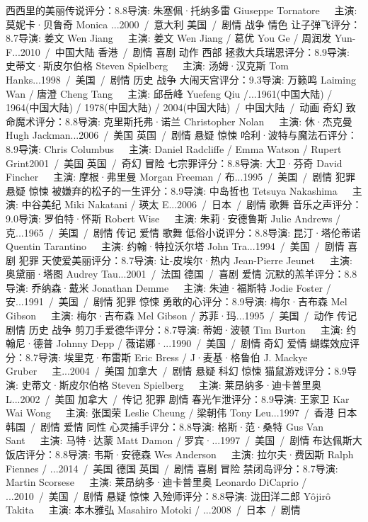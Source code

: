 西西里的美丽传说评分：8.8导演: 朱塞佩·托纳多雷 Giuseppe Tornatore   主演: 莫妮卡·贝鲁奇 Monica ...2000 / 意大利 美国 / 剧情 战争 情色
让子弹飞评分：8.7导演: 姜文 Wen Jiang   主演: 姜文 Wen Jiang / 葛优 You Ge / 周润发 Yun-F...2010 / 中国大陆 香港 / 剧情 喜剧 动作 西部
拯救大兵瑞恩评分：8.9导演: 史蒂文·斯皮尔伯格 Steven Spielberg   主演: 汤姆·汉克斯 Tom Hanks...1998 / 美国 / 剧情 历史 战争
大闹天宫评分：9.3导演: 万籁鸣 Laiming Wan / 唐澄 Cheng  Tang   主演: 邱岳峰 Yuefeng Qiu /...1961(中国大陆) / 1964(中国大陆) / 1978(中国大陆) / 2004(中国大陆) / 中国大陆 / 动画 奇幻
致命魔术评分：8.8导演: 克里斯托弗·诺兰 Christopher Nolan   主演: 休·杰克曼 Hugh Jackman...2006 / 美国 英国 / 剧情 悬疑 惊悚
哈利·波特与魔法石评分：8.9导演: Chris Columbus   主演: Daniel Radcliffe / Emma Watson / Rupert Grint2001 / 美国 英国 / 奇幻 冒险
七宗罪评分：8.8导演: 大卫·芬奇 David Fincher   主演: 摩根·弗里曼 Morgan Freeman / 布...1995 / 美国 / 剧情 犯罪 悬疑 惊悚
被嫌弃的松子的一生评分：8.9导演: 中岛哲也 Tetsuya Nakashima   主演: 中谷美纪 Miki Nakatani / 瑛太 E...2006 / 日本 / 剧情 歌舞
音乐之声评分：9.0导演: 罗伯特·怀斯 Robert Wise   主演: 朱莉·安德鲁斯 Julie Andrews / 克...1965 / 美国 / 剧情 传记 爱情 歌舞
低俗小说评分：8.8导演: 昆汀·塔伦蒂诺 Quentin Tarantino   主演: 约翰·特拉沃尔塔 John Tra...1994 / 美国 / 剧情 喜剧 犯罪
天使爱美丽评分：8.7导演: 让-皮埃尔·热内 Jean-Pierre Jeunet   主演: 奥黛丽·塔图 Audrey Tau...2001 / 法国 德国 / 喜剧 爱情
沉默的羔羊评分：8.8导演: 乔纳森·戴米 Jonathan Demme   主演: 朱迪·福斯特 Jodie Foster / 安...1991 / 美国 / 剧情 犯罪 惊悚
勇敢的心评分：8.9导演: 梅尔·吉布森 Mel Gibson   主演: 梅尔·吉布森 Mel Gibson / 苏菲·玛...1995 / 美国 / 动作 传记 剧情 历史 战争
剪刀手爱德华评分：8.7导演: 蒂姆·波顿 Tim Burton   主演: 约翰尼·德普 Johnny Depp / 薇诺娜·...1990 / 美国 / 剧情 奇幻 爱情
蝴蝶效应评分：8.7导演: 埃里克·布雷斯 Eric Bress / J·麦基·格鲁伯 J. Mackye Gruber   主...2004 / 美国 加拿大 / 剧情 悬疑 科幻 惊悚
猫鼠游戏评分：8.9导演: 史蒂文·斯皮尔伯格 Steven Spielberg   主演: 莱昂纳多·迪卡普里奥 L...2002 / 美国 加拿大 / 传记 犯罪 剧情
春光乍泄评分：8.9导演: 王家卫 Kar Wai Wong   主演: 张国荣 Leslie Cheung / 梁朝伟 Tony Leu...1997 / 香港 日本 韩国 / 剧情 爱情 同性
心灵捕手评分：8.8导演: 格斯·范·桑特 Gus Van Sant   主演: 马特·达蒙 Matt Damon / 罗宾·...1997 / 美国 / 剧情
布达佩斯大饭店评分：8.8导演: 韦斯·安德森 Wes Anderson   主演: 拉尔夫·费因斯 Ralph Fiennes / ...2014 / 美国 德国 英国 / 剧情 喜剧 冒险
禁闭岛评分：8.7导演: Martin Scorsese   主演: 莱昂纳多·迪卡普里奥 Leonardo DiCaprio / ...2010 / 美国 / 剧情 悬疑 惊悚
入殓师评分：8.8导演: 泷田洋二郎 Yôjirô Takita   主演: 本木雅弘 Masahiro Motoki / ...2008 / 日本 / 剧情

